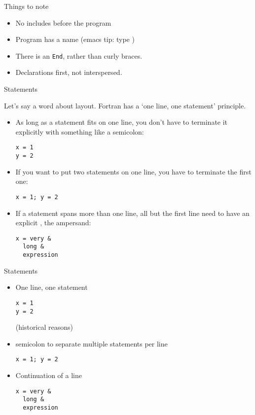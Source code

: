 \begin{block}{Things to note}
  \label{sl:programfnotes}
  \begin{itemize}
  \item No includes before the program
  \item Program has a name (emacs tip: type )
  \item There is an \lstinline{End}, rather than curly braces.
  \item Declarations first, not interspersed.
  \end{itemize}
\end{block}

 {Statements}

Let's say a word about layout. Fortran has a `one line, one statement'
principle.
\begin{itemize}
\item As long as a statement fits on one line, you don't have to
  terminate it explicitly with something like a semicolon:
\begin{lstlisting}
x = 1
y = 2
\end{lstlisting}
\item If you want to put two statements on one line, you have to
  terminate the first one:
\begin{lstlisting}
x = 1; y = 2
\end{lstlisting}
\item If a statement spans more than one line, all but the first line
  need to have an explicit , the ampersand:
\begin{lstlisting}
x = very &
  long &
  expression
\end{lstlisting}
\end{itemize}

\begin{slide}{Statements}
  \label{sl:fstatement}
  \begin{itemize}
  \item One line, one statement
\begin{lstlisting}
x = 1
y = 2
\end{lstlisting}
(historical reasons)
\item semicolon to separate multiple statements per line
\begin{lstlisting}
x = 1; y = 2
\end{lstlisting}
\item Continuation of a line
\begin{lstlisting}
x = very &
  long &
  expression
\end{lstlisting}
  \end{itemize}
\end{slide}

